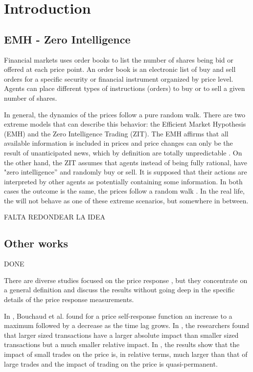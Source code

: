 \section{Introduction}\label{sec:introduction}

\subsection{EMH - Zero Intelligence}

Financial markets uses order books to list the number of shares being bid or
offered at each price point. An order book is an electronic list of buy and
sell orders for a specific security or financial instrument organized by price
level. Agents can place different types of instructions (orders) to buy or to
sell a given number of shares.

In general, the dynamics of the prices follow a pure random walk. There are two
extreme models that can describe this behavior: the Efficient Market Hypothesis
(EMH) and the Zero Intelligence Trading (ZIT). The EMH affirms that all
available information is included in prices and price changes can only be the
result of unanticipated news, which by definition are totally unpredictable
\cite{EMH_lillo,subtle_nature}. On the other hand, the ZIT assumes that agents
instead of being fully rational, have "zero intelligence” and randomly buy or
sell. It is supposed that their actions are interpreted by other agents as
potentially containing some information. In both cases the outcome is the same,
the prices follow a random walk \cite{subtle_nature,Wang_2016_cross}.
In the real life, the will not behave as one of these extreme scenarios, but
somewhere in between.

FALTA REDONDEAR LA IDEA


\subsection{Other works} DONE

There are diverse studies focused on the price response
\cite{dissecting_cross,r_walks_liquidity,subtle_nature,Bouchaud_2004,large_prices_changes,pow_law_dist,theory_market_impact,spread_changes_affect,master_curve,EMH_lillo,quant_stock_price_response,ori_pow_law,prop_order_book,Wang_2018_b,Wang_2018_a,Wang_2016_avg,Wang_2016_cross},
but they concentrate on a general definition and discuss the results without
going deep in the specific details of the price response measurements.

In \cite{r_walks_liquidity,subtle_nature,Bouchaud_2004}, Bouchaud et al. found
for a price self-response function an increase to a maximum followed by a
decrease as the time lag grows. In \cite{theory_market_impact}, the researchers
found that larger sized transactions have a larger absolute impact than smaller
sized transactions but a much smaller relative impact.
In \cite{prop_order_book}, the results show that the impact of small trades on
the price is, in relative terms, much larger than that of large trades and the
impact of trading on the price is quasi-permanent.

